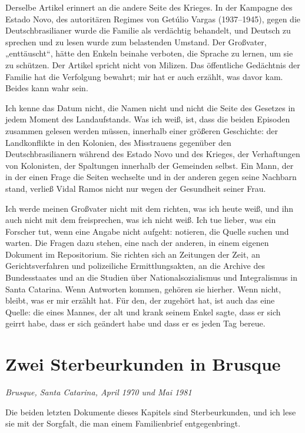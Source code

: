 \documentclass[
  ngerman,
  11pt,
  openany]{book}
\begin{document}
Derselbe Artikel erinnert an die andere Seite des Krieges. In der
Kampagne des Estado Novo, des autoritären Regimes von Getúlio Vargas
(1937--1945), gegen die Deutschbrasilianer wurde die Familie als
verdächtig behandelt, und Deutsch zu sprechen und zu lesen wurde zum
belastenden Umstand. Der Großvater, „enttäuscht``, hätte den Enkeln
beinahe verboten, die Sprache zu lernen, um sie zu schützen. Der Artikel
spricht nicht von Milizen. Das öffentliche Gedächtnis der Familie hat
die Verfolgung bewahrt; mir hat er auch erzählt, was davor kam. Beides
kann wahr sein.

Ich kenne das Datum nicht, die Namen nicht und nicht die Seite des
Gesetzes in jedem Moment des Landaufstands. Was ich weiß, ist, dass die
beiden Episoden zusammen gelesen werden müssen, innerhalb einer größeren
Geschichte: der Landkonflikte in den Kolonien, des Misstrauens gegenüber
den Deutschbrasilianern während des Estado Novo und des Krieges, der
Verhaftungen von Kolonisten, der Spaltungen innerhalb der Gemeinden
selbst. Ein Mann, der in der einen Frage die Seiten wechselte und in der
anderen gegen seine Nachbarn stand, verließ Vidal Ramos nicht nur wegen
der Gesundheit seiner Frau.

Ich werde meinen Großvater nicht mit dem richten, was ich heute weiß,
und ihn auch nicht mit dem freisprechen, was ich nicht weiß. Ich tue
lieber, was ein Forscher tut, wenn eine Angabe nicht aufgeht: notieren,
die Quelle suchen und warten. Die Fragen dazu stehen, eine nach der
anderen, in einem eigenen Dokument im Repositorium. Sie richten sich an
Zeitungen der Zeit, an Gerichtsverfahren und polizeiliche
Ermittlungsakten, an die Archive des Bundesstaates und an die Studien
über Nationalsozialismus und Integralismus in Santa Catarina. Wenn
Antworten kommen, gehören sie hierher. Wenn nicht, bleibt, was er mir
erzählt hat. Für den, der zugehört hat, ist auch das eine Quelle: die
eines Mannes, der alt und krank seinem Enkel sagte, dass er sich geirrt
habe, dass er sich geändert habe und dass er es jeden Tag bereue.

\section{Zwei Sterbeurkunden in
Brusque}\label{zwei-sterbeurkunden-in-brusque}

\emph{Brusque, Santa Catarina, April 1970 und Mai 1981}

Die beiden letzten Dokumente dieses Kapitels sind Sterbeurkunden, und
ich lese sie mit der Sorgfalt, die man einem Familienbrief
entgegenbringt.
\end{document}
